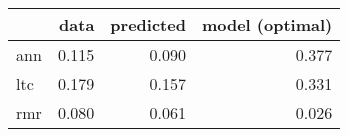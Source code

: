 \begin{tabular}{lrrr}
\toprule
{} &   data &  predicted &  model (optimal) \\
\midrule
ann &  0.115 &      0.090 &            0.377 \\
ltc &  0.179 &      0.157 &            0.331 \\
rmr &  0.080 &      0.061 &            0.026 \\
\bottomrule
\end{tabular}
